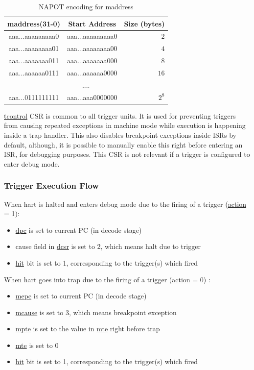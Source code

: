 \documentclass[main\_\_EN.tex]{subfiles}
\begin{document}
\begin{longtable}{ | c | c | r | }
\caption{NAPOT encoding for maddress} \label{tab:riscvcpu-hwt-table}
\\ \hline
\rowcolor{lightgray}
maddress(31-0) & Start Address & Size (bytes) \\ \hline
aaa...aaaaaaaaa0 & aaa...aaaaaaaaa0 & $2$ \\ \hline
aaa...aaaaaaaa01 & aaa...aaaaaaaa00 & $4$ \\ \hline
aaa...aaaaaaa011 & aaa...aaaaaaa000 & $8$ \\ \hline
aaa...aaaaaa0111 & aaa...aaaaaa0000 & $16$ \\ \hline
\multicolumn{3}{c}{....} \\ \hline
aaa...0111111111 & aaa...aaa0000000 & $2^{8}$ \\ \hline
\end{longtable}

\hyperref[regdesc:TCONTROL]{tcontrol} CSR is common to all trigger units. It is used for preventing triggers from causing repeated exceptions in machine mode while execution is happening inside a trap handler. This also disables breakpoint exceptions inside ISRs by default, although, it is possible to manually enable this right before entering an ISR, for debugging purposes. This CSR is not relevant if a trigger is configured to enter debug mode.

\subsubsection{Trigger Execution Flow}
\label{sec:riscvcpu-hwt-suggest-op}

When hart is halted and enters debug mode due to the firing of a trigger (\hyperref[fielddesc:MCONTROLACTION]{action} = 1):
\begin{itemize}
    \item \hyperref[regdesc:DPC]{dpc} is set to current PC (in decode stage)
    \item cause field in \hyperref[regdesc:DCSR]{dcsr} is set to 2, which means halt due to trigger
    \item \hyperref[fielddesc:MCONTROLHIT]{hit} bit is set to 1, corresponding to the trigger(s) which fired
\end{itemize}

When hart goes into trap due to the firing of a trigger (\hyperref[fielddesc:MCONTROLACTION]{action} = 0) :
\begin{itemize}
    \item \hyperref[regdesc:MEPC]{mepc} is set to current PC (in decode stage)
    \item \hyperref[regdesc:MCAUSE]{mcause} is set to 3, which means breakpoint exception
    \item \hyperref[fielddesc:TCONTROLMPTE]{mpte} is set to the value in \hyperref[fielddesc:TCONTROLMTE]{mte} right before trap
    \item \hyperref[fielddesc:TCONTROLMTE]{mte} is set to 0
    \item \hyperref[fielddesc:MCONTROLHIT]{hit} bit is set to 1, corresponding to the trigger(s) which fired
\end{itemize}
\end{document}
